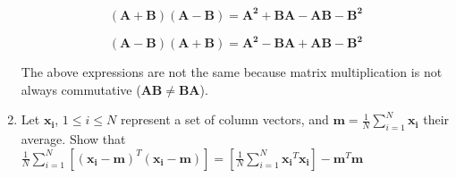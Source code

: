 \documentclass[fleqn]{article}
\begin{document}
\begin{enumerate}
		\begin{equation*}
		(\mathbf{A} + \mathbf{B})(\mathbf{A} - \mathbf{B}) = \mathbf{A^2} + \mathbf{B}\mathbf{A} - \mathbf{A}\mathbf{B} - \mathbf{B^2}
		\end{equation*}
		
		\begin{equation*}
		(\mathbf{A} - \mathbf{B})(\mathbf{A} + \mathbf{B}) = \mathbf{A^2} - \mathbf{B}\mathbf{A} + \mathbf{A}\mathbf{B} - \mathbf{B^2}
		\end{equation*}
		
		The above expressions are not the same because matrix multiplication is not always commutative ($\mathbf{AB} \neq \mathbf{BA}$).
		
		\item Let $\mathbf{x_i}$, $1 \leq i \leq N$ represent a set of column vectors, and $\mathbf{m} = \frac{1}{N}\sum_{i=1}^{N}{\mathbf{x_i}}$ their average. Show that $\frac{1}{N}\sum_{i=1}^{N}\left[(\mathbf{x_i}-\mathbf{m})^T(\mathbf{x_i}-\mathbf{m})\right] = \left[\frac{1}{N}\sum_{i=1}^{N}{\mathbf{x_i}^T\mathbf{x_i}}\right]-\mathbf{m}^T\mathbf{m}$
		\end{enumerate}
\end{document}
